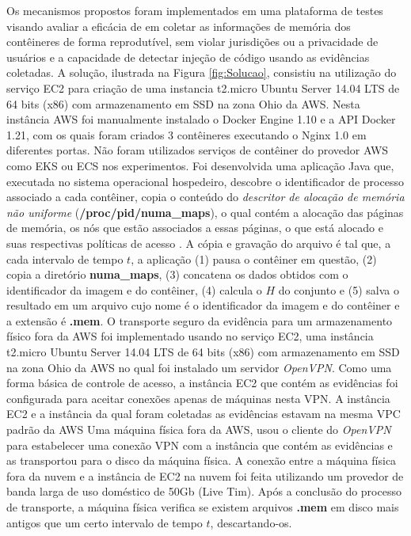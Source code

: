 %
Os mecanismos propostos foram implementados em uma plataforma de testes visando avaliar a eficácia de \fancyname em coletar as informações de memória dos contêineres de forma reprodutível, sem violar jurisdições ou a privacidade de usuários e a capacidade de detectar injeção de código usando as evidências coletadas.
%
A solução, ilustrada na Figura \ref{fig:Solucao}, consistiu na utilização do serviço EC2 para criação de uma instancia t2.micro Ubuntu Server 14.04 LTS de 64 bits (x86) com armazenamento em SSD na zona Ohio da AWS. 
%
Nesta instância AWS foi manualmente instalado o Docker Engine 1.10 e a API Docker 1.21, com os quais foram criados 3 contêineres executando o Nginx 1.0 em diferentes portas. 
%
Não foram utilizados serviços de contêiner do provedor AWS como EKS ou ECS nos experimentos.
%
Foi desenvolvida uma aplicação Java que, executada no sistema operacional hospedeiro, descobre o identificador de processo associado a cada contêiner, copia o conteúdo do \textit{descritor de alocação de memória não uniforme} (\textbf{/proc/pid/numa\_maps}), o qual contém a alocação das páginas de memória, os nós que estão associados a essas páginas, o que está alocado e suas respectivas políticas de acesso \cite{UnixManPagesNumaMaps}.
%
A cópia e gravação do arquivo é tal que, a cada intervalo de tempo $t$, a aplicação (1) pausa o contêiner em questão, (2) copia a diretório \textbf{numa\_maps}, (3)  concatena os dados obtidos com o identificador da imagem e do contêiner, (4) calcula o $H$ do conjunto e (5) salva o resultado em um arquivo cujo nome é o identificador da imagem e do contêiner e a extensão é \textbf{.mem}. 
%
O transporte seguro da evidência para um armazenamento físico fora da AWS foi implementado usando no serviço EC2, uma instância t2.micro Ubuntu Server 14.04 LTS de 64 bits (x86) com armazenamento em SSD na zona Ohio da AWS no qual foi instalado um servidor \textit{OpenVPN}.
%
Como uma forma básica de controle de acesso, a instância EC2 que contém as evidências foi configurada para aceitar conexões apenas de máquinas nesta VPN.
%
A instância EC2 e a instância da qual foram coletadas as evidências estavam na mesma VPC padrão da AWS
%
Uma máquina física fora da AWS, usou o cliente do \textit{OpenVPN} para estabelecer uma conexão VPN com a instância que contém as evidências e as transportou para o disco da máquina física.
%
A conexão entre a máquina física fora da nuvem e a instância de EC2 na nuvem foi feita utilizando um provedor de banda larga de uso doméstico de 50Gb (Live Tim).
%
Após a conclusão do processo de transporte, a máquina física verifica se existem arquivos \textbf{.mem} em disco mais antigos que um certo intervalo de tempo $t$, descartando-os.
%


